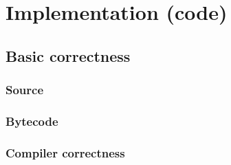 \section{Implementation (code)}

    \subsection{Basic correctness}

        \begin{frame}
            \frametitle{Source}



        \end{frame}

        \begin{frame}
            \frametitle{Bytecode}


        \end{frame}

        \begin{frame}
            \frametitle{Compiler correctness}
        \end{frame}


